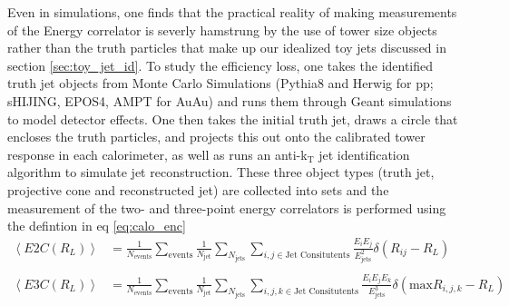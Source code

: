 \documentclass[letterpaper, 12pt, oneside]{book}
\theoremstyle{definition}
\begin{document}
	Even in simulations, one finds that the practical reality of making measurements of the Energy correlator is severly hamstrung by the use of tower size objects rather than the truth particles that make up our idealized toy jets discussed in section \ref{sec:toy_jet_id}. 
	To study the efficiency loss, one takes the identified truth jet objects from Monte Carlo Simulations (Pythia8 and Herwig for pp; sHIJING, EPOS4, AMPT for AuAu) and runs them through Geant simulations to model detector effects.
	One then takes the initial truth jet, draws a circle that encloses the truth particles, and projects this out onto the calibrated tower response in each calorimeter, as well as runs an anti-k$_{\textrm{T}}$ jet identification algorithm to simulate jet reconstruction.
	These three object types (truth jet, projective cone and reconstructed jet) are collected into sets and the measurement of the two- and three-point energy correlators is performed using the defintion in eq \ref{eq:calo_enc}
	\begin{equation}
		\begin{split}
			\left< E2C \left( R_L \right) \right> &= \frac{1}{N_\textrm{events}} \sum_{\textrm{events}} \frac{1}{N_\textrm{jet}} \sum_{N_{\textrm{jets}}} \sum_{i,j \in \textrm{Jet Consitutents}} \frac{E_{i} E_{j}}{E_\textrm{jets}^2} \delta \left( R_{ij} - R_L \right) \\  \\
			\left< E3C \left( R_L \right) \right> &= \frac{1}{N_\textrm{events}} \sum_{\textrm{events}} \frac{1}{N_\textrm{jet}} \sum_{N_{\textrm{jets}}} \sum_{i,j,k \in \textrm{Jet Consitutents}} \frac{E_{i} E_{j} E_{k}}{E_\textrm{jets}^3} \delta \left( \textrm{max}{R_{i,j,k}} - R_L \right) 
		\end{split}
		\label{eq:calo_enc}
	\end{equation}
\end{document}
